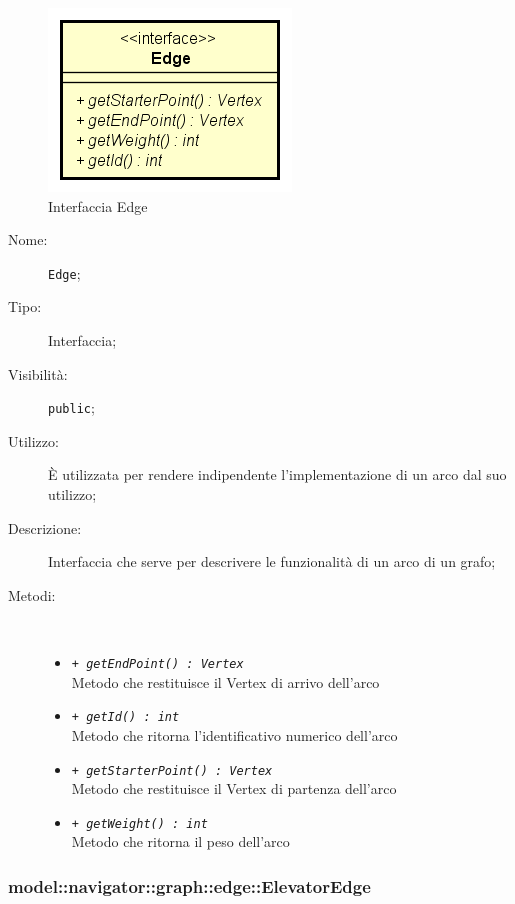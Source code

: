 \documentclass[../DefinizioneDiProdotto.tex]{subfiles}
\begin{document}
    \begin{figure}[H]
        \centering
        \includegraphics{img/Edge.png}
        \caption{Interfaccia Edge}\label{fig:model::navigator::graph::edge::Edge} 
    \end{figure}
    \begin{description}
\item[Nome:] \texttt{Edge};
\item[Tipo:] Interfaccia;
\item[Visibilità:] \texttt{public};
\item[Utilizzo:] È utilizzata per rendere indipendente l'implementazione di un arco dal suo utilizzo;
\item[Descrizione:] Interfaccia che serve per descrivere le funzionalità di un arco di un grafo;
\item[Metodi:] \
\begin{itemize}
\item \texttt{+ \textit{getEndPoint() : Vertex}}\\
Metodo che restituisce il Vertex di arrivo dell'arco
 \item \texttt{+ \textit{getId() : int}}\\
Metodo che ritorna l'identificativo numerico dell'arco
 \item \texttt{+ \textit{getStarterPoint() : Vertex}}\\
Metodo che restituisce il Vertex di partenza dell'arco
 \item \texttt{+ \textit{getWeight() : int}}\\
Metodo che ritorna il peso dell'arco
 \end{itemize}
\end{description}

\subsubsection{model::navigator::graph::edge::ElevatorEdge}
\end{document}
